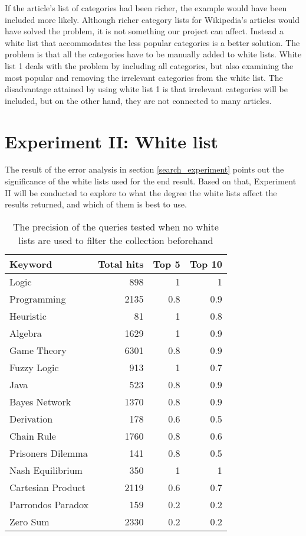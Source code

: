 If the article's list of categories had been richer, the example would have been included more likely. Although richer category lists for Wikipedia's articles would have solved the problem, it is not something our project can affect. Instead a white list that accommodates the less popular categories is a better solution. The problem is that all the categories have to be manually added to white lists. White list 1 deals with the problem by including all categories, but also examining the most popular and removing the irrelevant categories from the white list. The disadvantage attained by using white list 1 is that irrelevant categories will be included, but on the other hand, they are not connected to many articles. 

\section{Experiment II: White list}

The result of the error analysis in section \ref{search_experiment} points out the significance of the white lists used for the end result. Based on that, Experiment II will be conducted to explore to what the degree the white lists affect the results returned, and which of them is best to use.

\begin{table}[h!]
\centering
\begin{tabular} {|| p{15em} | r | r | r ||} 
 \hline
 Keyword & Total hits & Top 5 & Top 10 \\ [0.5ex] 
 \hline

Logic & 898 & 1 & 1 \\
Programming & 2135 & 0.8 & 0.9 \\
Heuristic & 81 & 1 & 0.8 \\
Algebra & 1629 & 1 & 0.9 \\
Game Theory & 6301 & 0.8 & 0.9 \\
\hline
Fuzzy Logic & 913 & 1 & 0.7 \\
Java & 523 & 0.8 & 0.9 \\
Bayes Network & 1370 & 0.8 & 0.9 \\
Derivation & 178 & 0.6 & 0.5 \\
\hline
Chain Rule & 1760 & 0.8 & 0.6 \\
Prisoners Dilemma & 141 & 0.8 & 0.5 \\
Nash Equilibrium & 350 & 1 & 1 \\
Cartesian Product & 2119 & 0.6 & 0.7 \\
Parrondos Paradox & 159 & 0.2 & 0.2 \\
Zero Sum & 2330 & 0.2 & 0.2 \\

 \hline
\end{tabular}
\caption{The precision of the queries tested when no white lists are used to filter the collection beforehand}
\label{table:p_test_no-list}
\end{table}



